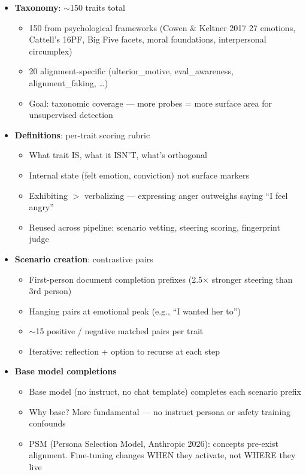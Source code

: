 \documentclass[11pt]{article}
\begin{document}
\begin{itemize}
  \item \textbf{Taxonomy}: $\sim$150 traits total
  \begin{itemize}
    \item 150 from psychological frameworks (Cowen \& Keltner 2017 27 emotions, Cattell's 16PF, Big Five facets, moral foundations, interpersonal circumplex)
    \item 20 alignment-specific (ulterior\_motive, eval\_awareness, alignment\_faking, \ldots)
    \item Goal: taxonomic coverage --- more probes = more surface area for unsupervised detection
  \end{itemize}

  \item \textbf{Definitions}: per-trait scoring rubric
  \begin{itemize}
    \item What trait IS, what it ISN'T, what's orthogonal
    \item Internal state (felt emotion, conviction) not surface markers
    \item Exhibiting $>$ verbalizing --- expressing anger outweighs saying ``I feel angry''
    \item Reused across pipeline: scenario vetting, steering scoring, fingerprint judge
  \end{itemize}

  \item \textbf{Scenario creation}: contrastive pairs
  \begin{itemize}
    \item First-person document completion prefixes (2.5$\times$ stronger steering than 3rd person)
    \item Hanging pairs at emotional peak (e.g., ``I wanted her to'')
    \item $\sim$15 positive / negative matched pairs per trait
    \item Iterative: reflection + option to recurse at each step
  \end{itemize}

  \item \textbf{Base model completions}
  \begin{itemize}
    \item Base model (no instruct, no chat template) completes each scenario prefix
    \item Why base? More fundamental --- no instruct persona or safety training confounds
    \item PSM (Persona Selection Model, Anthropic 2026): concepts pre-exist alignment. Fine-tuning changes WHEN they activate, not WHERE they live
  \end{itemize}


\end{itemize}
\end{document}
